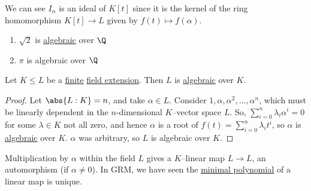 \documentclass{article}
\begin{document}
\begin{remark}
    We can see $I_\alpha$ is an ideal of $K[t]$ since it is the kernel of the ring homomorphism $K[t] \to L$ given by $f(t) \mapsto f(\alpha)$.
\end{remark}

\begin{eg}
    \leavevmode
    \begin{enumerate}[label=(\roman*)]
        \item $\sqrt{2}$ is \hyperlink{def:algebraic}{algebraic} over $\Q$
        \item $\pi$ is algebraic over $\Q$
    \end{enumerate}
\end{eg}

\begin{nlemma}\label{lem:1.5}
    Let $K \leq L$ be a \hyperlink{def:degreeOfFieldExt}{finite} \hyperlink{def:fieldExt}{field extension}. Then $L$ is \hyperlink{def:algebraic}{algebraic} over $K$.
\end{nlemma}

\begin{proof}
    Let $\abs{L:K}=n$, and take $\alpha \in L$. Consider $1, \alpha, \alpha^2, \dotsc, \alpha^n$, which must be linearly dependent in the $n$-dimensional $K$--vector space $L$.
    So, $\sum_{i=0}^n \lambda_i \alpha^i = 0$ for some $\lambda \in K$ not all zero, and hence $\alpha$ is a root of $f(t) = \sum_{i=0}^n \lambda_i t^i$, so $\alpha$ is \hyperlink{def:algebraic}{algebraic} over $K$.
    $\alpha$ was arbitrary, so $L$ is algebraic over $K$.
\end{proof}


\begin{remark}
    Multiplication by $\alpha$ within the field $L$ gives a $K$--linear map $L \to L$, an automorphism (if $\alpha \ne 0$).  In GRM, we have seen the \hyperlink{def:minimalPoly}{minimal polynomial} of a linear map is unique.
\end{remark}
\end{document}
